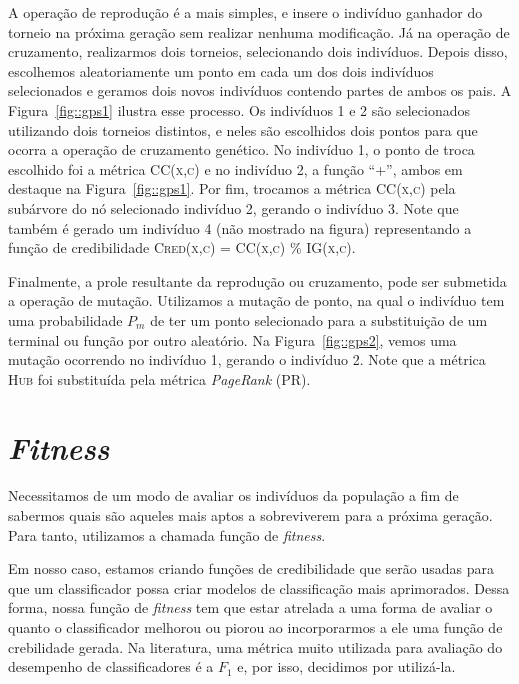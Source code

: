 A operação de reprodução é a mais simples, e insere o indivíduo ganhador do torneio na próxima geração sem realizar nenhuma modificação. Já na operação de cruzamento, realizarmos dois torneios, selecionando dois indivíduos. Depois disso, escolhemos aleatoriamente um ponto em cada um dos dois indivíduos selecionados e geramos dois novos indivíduos contendo partes de ambos os pais. A Figura~\ref{fig::gps1} ilustra esse processo. 
Os indivíduos 1 e 2 são selecionados utilizando dois torneios distintos, e neles são escolhidos dois pontos para que ocorra a operação de cruzamento genético. 
No indivíduo 1, o ponto de troca escolhido foi a métrica 
\textsc{CC(x,c)} 
e no indivíduo 2, a função ``+'', ambos em destaque na Figura~\ref{fig::gps1}.
Por fim, trocamos a métrica \textsc{CC(x,c)} pela subárvore do nó selecionado indivíduo 2, gerando o indivíduo 3. 
Note que também é gerado um indivíduo 4 (não mostrado na figura) representando a função de credibilidade \textsc{Cred(x,c) = CC(x,c) \% IG(x,c)}. 

Finalmente, a prole resultante da reprodução ou cruzamento, pode ser submetida a operação de mutação. Utilizamos a mutação de ponto, na qual o indivíduo tem uma probabilidade $P_m$ de ter um ponto selecionado para a substituição de um terminal ou função por outro aleatório.
Na Figura~\ref{fig::gps2}, vemos uma mutação ocorrendo no indivíduo 1, gerando o indivíduo 2. Note que a métrica \textsc{Hub} foi substituída pela métrica \textit{PageRank} (\textsc{PR}).


\section{\textit{Fitness}}
\label{subsec::fitness}

Necessitamos de um modo de avaliar os indivíduos da população a fim de sabermos quais são aqueles mais aptos a sobreviverem para a próxima geração. 
Para tanto, utilizamos a chamada função de \textit{fitness}. 

Em nosso caso, estamos criando funções de credibilidade que serão usadas para que um classificador possa criar modelos de classificação mais aprimorados.
Dessa forma, nossa função de \textit{fitness} tem que estar atrelada a uma forma de avaliar o quanto o classificador melhorou ou piorou ao incorporarmos a ele uma função de crebilidade gerada.
Na literatura, uma métrica muito utilizada para avaliação do desempenho de classificadores é a $F_1$ e, por isso, decidimos por utilizá-la.

